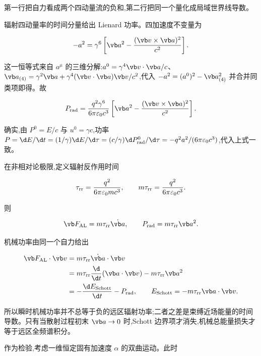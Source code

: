 第一行把自力看成两个四动量流的负和,第二行把同一个量化成局域世界线导数。

辐射四动量率的时间分量给出 Lienard 功率。四加速度不变量为

\begin{equation*}
 -a^2
 =\gamma^6
 \left[
 \vb a^2-{(\vb v\times\vb a)^2\over c^2}
 \right].
\end{equation*}

这一恒等式来自 $a^\mu$ 的三维分解:$a^0=\gamma^4\vb v\cdot\vb a/c$、$\vb a_{(4)}=\gamma^2\vb a+\gamma^4(\vb v\cdot\vb a)\vb v/c^2$,代入 $-a^2=(a^0)^2-\vb a_{(4)}^2$ 并合并同类项即得。故

\begin{equation*}
 P_{\mathrm{rad}}
 ={q^2\gamma^6\over6\pi\varepsilon_0c^3}
 \left[
 \vb a^2-{(\vb v\times\vb a)^2\over c^2}
 \right].
\end{equation*}

确实,由 $P^0=E/c$ 与 $u^0=\gamma c$,功率 $P=\d E/\d t=(1/\gamma)\d E/\d\tau=(c/\gamma)\d P_{\mathrm{rad}}^0/\d\tau=-q^2a^2/(6\pi\varepsilon_0c^3)$,代入上式一致。

在非相对论极限,定义辐射反作用时间

\begin{equation*}
 \tau_{\mathrm{rr}}
 ={q^2\over6\pi\varepsilon_0mc^3},
 \qquad
 m\tau_{\mathrm{rr}}={q^2\over6\pi\varepsilon_0c^3}.
\end{equation*}

则

\begin{equation*}
 \vb F_{\mathrm{AL}}=m\tau_{\mathrm{rr}}\dot{\vb a},
 \qquad
 P_{\mathrm{rad}}=m\tau_{\mathrm{rr}}\vb a^2.
\end{equation*}

机械功率由同一个自力给出

\begin{align*}
 \vb F_{\mathrm{AL}}\cdot\vb v
 &=m\tau_{\mathrm{rr}}\dot{\vb a}\cdot\vb v\\
 &=m\tau_{\mathrm{rr}}{\d\over\d t}(\vb a\cdot\vb v)
 -m\tau_{\mathrm{rr}}\vb a^2\\
 &=-{\d E_{\mathrm{Schott}}\over\d t}-P_{\mathrm{rad}},
 \qquad
 E_{\mathrm{Schott}}=-m\tau_{\mathrm{rr}}\vb a\cdot\vb v.
\end{align*}

所以瞬时机械功率并不总等于负的远区辐射功率;二者之差是束缚近场能量的时间导数。只有当散射过程初末 $\vb a\to0$ 时,Schott 边界项才消失,机械总能量损失才等于远区全频谱积分。

作为检验,考虑一维恒定固有加速度 $\alpha$ 的双曲运动。此时

